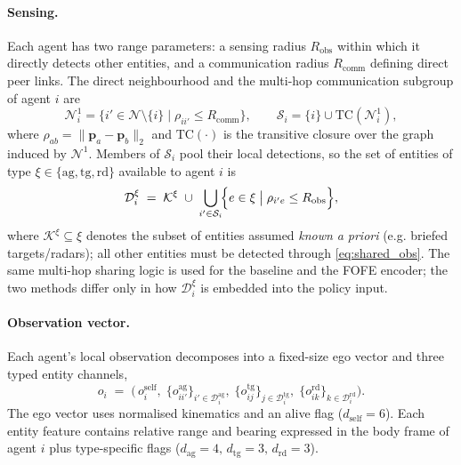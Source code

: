 \paragraph{Sensing.}
Each agent has two range parameters: a sensing radius $R_{\mathrm{obs}}$
within which it directly detects other entities, and a communication radius
$R_{\mathrm{comm}}$ defining direct peer links. The direct neighbourhood and
the multi-hop communication subgroup of agent $i$ are
\begin{equation}
\mathcal{N}_i^{1} = \bigl\{ i' \in \mathcal{N}\setminus\{i\}\;\bigl|\;
 \rho_{ii'}\le R_{\mathrm{comm}} \bigr\},
\qquad
\mathcal{S}_i = \{i\}\cup \mathrm{TC}(\mathcal{N}_i^{1}),
\label{eq:comm_sets}
\end{equation}
where $\rho_{ab}=\|\mathbf{p}_a-\mathbf{p}_b\|_2$ and $\mathrm{TC}(\cdot)$ is
the transitive closure over the graph induced by $\mathcal{N}^{1}$. Members of
$\mathcal{S}_i$ pool their local detections, so the set of entities of
type $\xi\in\{\mathrm{ag},\mathrm{tg},\mathrm{rd}\}$ available to agent $i$
is
\begin{equation}
\mathcal{D}_i^{\xi} \;=\; \mathcal{K}^{\xi}\;\cup\;
\bigcup_{i'\in\mathcal{S}_i}\!\Bigl\{ e\in\xi\;\bigl|\;
\rho_{i'e}\le R_{\mathrm{obs}}\Bigr\},
\label{eq:shared_obs}
\end{equation}
where $\mathcal{K}^{\xi}\subseteq\xi$ denotes the subset of entities assumed
\emph{known} \emph{a priori} (e.g. briefed targets/radars); all other entities
must be detected through \eqref{eq:shared_obs}. The same multi-hop sharing
logic is used for the baseline and the FOFE encoder; the two methods differ
only in how $\mathcal{D}_i^{\xi}$ is embedded into the policy input.

\paragraph{Observation vector.}
Each agent's local observation decomposes into a fixed-size ego vector and
three typed entity channels,
\begin{equation}
o_i \;=\; \bigl(\, o_i^{\mathrm{self}},\;
\{o_{ii'}^{\mathrm{ag}}\}_{i'\in\mathcal{D}_i^{\mathrm{ag}}},\;
\{o_{ij}^{\mathrm{tg}}\}_{j\in\mathcal{D}_i^{\mathrm{tg}}},\;
\{o_{ik}^{\mathrm{rd}}\}_{k\in\mathcal{D}_i^{\mathrm{rd}}}\bigr).
\label{eq:obs_vector}
\end{equation}
The ego vector uses normalised kinematics and an alive flag
($d_{\mathrm{self}}=6$). Each entity feature contains relative range and
bearing expressed in the body frame of agent $i$ plus type-specific flags
($d_{\mathrm{ag}}=4,\,d_{\mathrm{tg}}=3,\,d_{\mathrm{rd}}=3$).

